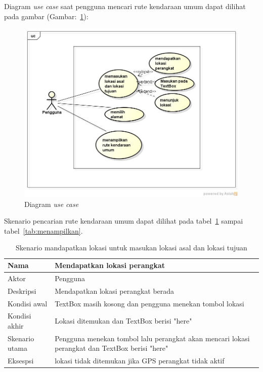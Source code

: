 \newpage
Diagram \textit{use case} saat pengguna mencari rute kendaraan umum dapat dilihat pada gambar (Gambar:~\ref{fig:UseCase}):
\begin{figure}[h]
	\centering
		\includegraphics[scale=0.5]{Gambar/useCase_dan_Class/UseCase}
	\caption{Diagram \textit{use case}}
	\label{fig:UseCase}
\end{figure}

Skenario pencarian rute kendaraan umum dapat dilihat pada tabel~\ref{tab:mandapatLokasi} sampai tabel~\ref{tab:menampilkan}.
\begin{table}[H]
	\centering
		\begin{tabular}{ |p{2cm}|p{10cm}| }
			\hline
			Nama &  Mendapatkan lokasi perangkat\\ \hline
			Aktor & Pengguna  \\ \hline
			Deskripsi & Mendapatkan lokasi perangkat berada  \\ \hline
			Kondisi awal & TextBox masih kosong dan pengguna menekan tombol lokasi \\ \hline
			Kondisi akhir & Lokasi ditemukan dan TextBox berisi "here" \\ \hline
			Skenario utama & Pengguna menekan tombol lalu perangkat akan mencari lokasi perangkat dan TextBox berisi "here" \\ \hline
			Eksespsi & lokasi tidak ditemukan jika GPS perangkat tidak aktif  \\ 
			\hline
		\end{tabular}
	\caption{Skenario mandapatkan lokasi untuk masukan lokasi asal dan lokasi tujuan}
	\label{tab:mandapatLokasi}
\end{table}


